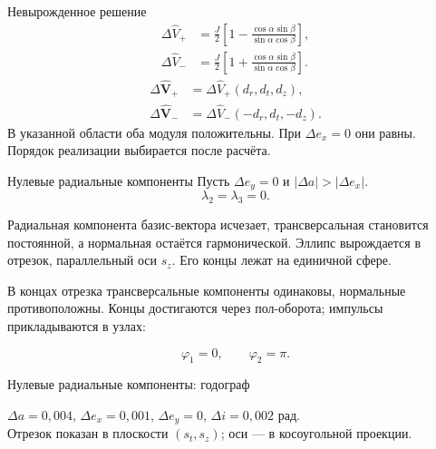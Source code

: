 \documentclass[11pt,aspectratio=169,t]{beamer}
\newcommand{\figcaption}[1]{{\usebeamerfont{caption}\color{coursemuted}#1\par}}
\newcommand{\derivationmathspacing}{%
  \setlength{\abovedisplayskip}{2pt}%
  \setlength{\belowdisplayskip}{3pt}%
  \setlength{\abovedisplayshortskip}{2pt}%
  \setlength{\belowdisplayshortskip}{2pt}%
  \setlength{\jot}{2pt}}
\begin{document}
\begin{frame}{Невырожденное решение}
\relax
\derivationmathspacing
\[
\begin{aligned}
\Delta\widehat V_+&=\frac J2\left[
1-\frac{\cos\alpha\sin\beta}{\sin\alpha\cos\beta}\right],\\
\Delta\widehat V_-&=\frac J2\left[
1+\frac{\cos\alpha\sin\beta}{\sin\alpha\cos\beta}\right].
\end{aligned}
\]
\[
\begin{aligned}
\Delta\widehat{\boldsymbol V}_+
&=\Delta\widehat V_+(d_r,d_t,d_z),\\
\Delta\widehat{\boldsymbol V}_-
&=\Delta\widehat V_-(-d_r,d_t,-d_z).
\end{aligned}
\]
\medskip
\justifying
В указанной области оба модуля положительны.
При $\Delta e_x=0$ они равны. Порядок реализации выбирается после расчёта.
\end{frame}

\begin{frame}{Нулевые радиальные компоненты}
\relax
\derivationmathspacing
Пусть $\Delta e_y=0$ и $|\Delta a|>|\Delta e_x|$.
\[
\lambda_2=\lambda_3=0.
\]
{\justifying
Радиальная компонента базис-вектора исчезает, трансверсальная
становится постоянной, а нормальная остаётся гармонической.
Эллипс вырождается в отрезок, параллельный оси $s_z$.
Его концы лежат на единичной сфере.
\par\medskip
В концах отрезка трансверсальные компоненты одинаковы,
нормальные противоположны. Концы достигаются через пол-оборота;
импульсы прикладываются в узлах:
\par}
\[
\varphi_1=0,\qquad\varphi_2=\pi.
\]
\end{frame}

\begin{frame}{Нулевые радиальные компоненты: годограф}
\relax
\centering

\par
\figcaption{$\Delta a=0{,}004$, $\Delta e_x=0{,}001$, $\Delta e_y=0$, $\Delta i=0{,}002$ рад.\\
Отрезок показан в плоскости $(s_t,s_z)$; оси --- в косоугольной проекции.}
\end{frame}
\end{document}
